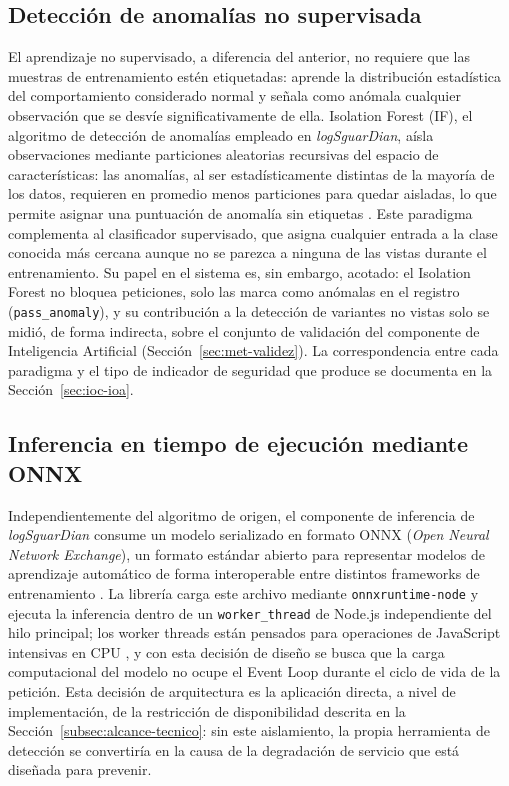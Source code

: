 \subsection{Detección de anomalías no supervisada}
El aprendizaje no supervisado, a diferencia del anterior, no requiere que las muestras de
entrenamiento estén etiquetadas: aprende la distribución estadística del comportamiento
considerado normal y señala como anómala cualquier observación que se desvíe significativamente de
ella. Isolation Forest (IF), el algoritmo de detección de anomalías empleado en \textit{logSguarDian},
aísla observaciones mediante particiones aleatorias recursivas del espacio de características: las
anomalías, al ser estadísticamente distintas de la mayoría de los datos, requieren en promedio
menos particiones para quedar aisladas, lo que permite asignar una puntuación de anomalía sin
etiquetas \cite{liu2008isolation}. Este paradigma complementa al clasificador supervisado, que
asigna cualquier entrada a la clase conocida más cercana aunque no se parezca a ninguna de las
vistas durante el entrenamiento. Su papel en el sistema es, sin embargo, acotado: el Isolation
Forest no bloquea peticiones, solo las marca como anómalas en el registro (\texttt{pass\_anomaly}),
y su contribución a la detección de variantes no vistas solo se midió, de forma indirecta, sobre el
conjunto de validación del componente de Inteligencia Artificial \cite{valenzuela2026ia}
(Sección~\ref{sec:met-validez}). La correspondencia entre cada paradigma y el tipo de indicador
de seguridad que produce se documenta en la Sección~\ref{sec:ioc-ioa}.

\subsection{Inferencia en tiempo de ejecución mediante ONNX}
\label{sec:onnx-inferencia}
Independientemente del algoritmo de origen, el componente de inferencia de \textit{logSguarDian}
consume un modelo serializado en formato ONNX (\textit{Open Neural Network Exchange}), un
formato estándar abierto para representar modelos de aprendizaje automático de forma
interoperable entre distintos frameworks de entrenamiento \cite{onnx2026}. La librería carga este
archivo mediante \texttt{onnxruntime-node} \cite{onnxruntimedocs} y ejecuta la inferencia dentro de
un \texttt{worker\_thread} de Node.js independiente del hilo principal; los worker threads están
pensados para operaciones de JavaScript intensivas en CPU \cite{nodejs2026worker}, y con esta
decisión de diseño se busca que la carga computacional del modelo no ocupe el Event Loop durante el
ciclo de vida de la petición. Esta decisión de arquitectura es la aplicación directa, a nivel de
implementación, de la restricción de disponibilidad descrita en la Sección~\ref{subsec:alcance-tecnico}:
sin este aislamiento, la propia herramienta de detección se convertiría en la causa de la
degradación de servicio que está diseñada para prevenir.

